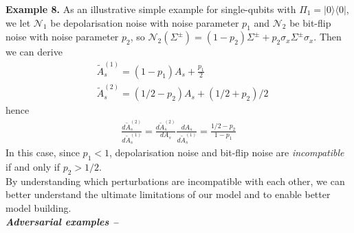 \documentclass[onecolumn,prx, superscriptaddress,longbibliography,margin=1mm 11pt]{revtex4-2}
\begin{document}
\noindent \textbf{Example 8.}
As an illustrative simple example for single-qubits with $\Pi_1=|0\rangle \langle 0|$, we let $\mathcal{N}_1$ be depolarisation noise with noise parameter $p_1$ and $\mathcal{N}_2$ be bit-flip noise with noise parameter $p_2$, so $\mathcal{N}_2(\Sigma^{\pm})=(1-p_2)\Sigma^{\pm}+p_2 \sigma_x \Sigma^{\pm} \sigma_x$. Then we can derive
\begin{align}
    & \tilde{A}^{(1)}_s=(1-p_1)A_s+\frac{p_1}{2}\nonumber \\
    &\tilde{A}^{(2)}_s=(1/2-p_2)A_s+(1/2+p_2)/2
\end{align}
hence
\begin{align}
     \frac{d \tilde{A}^{(2)}_s}{d\tilde{A}^{(1)}_s}= \frac{d \tilde{A}^{(2)}_s}{d A_s} \frac{d A_s}{d\tilde{A}^{(1)}_s}=\frac{1/2-p_2}{1-p_1}
\end{align}
In this case, since $p_1<1$, depolarisation noise and bit-flip noise are \textit{incompatible} if and only if $p_2>1/2$.\\

By understanding which perturbations are incompatible with each other, we can better understand the ultimate limitations of our model and to enable better model building. \\

\noindent \textbf{\textit{Adversarial examples --}}\\
\end{document}
